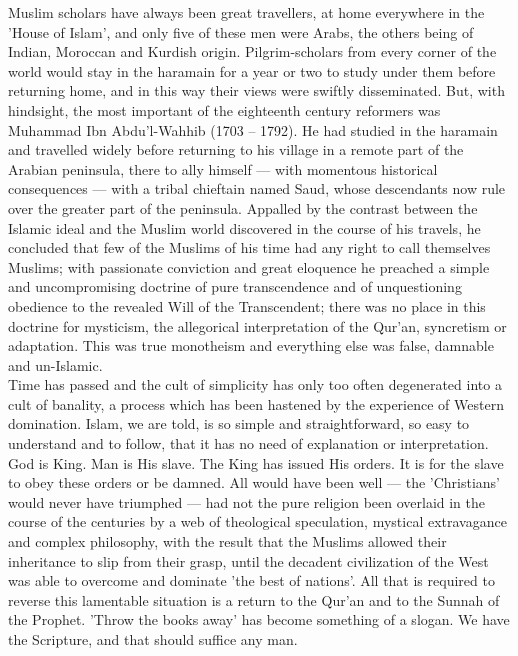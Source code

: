 \documentclass[10pt, twoside,openright]{book}
\begin{document}
Muslim scholars have always been great travellers, at home everywhere in the 'House of Islam', and only five of these men were Arabs, the others being of Indian, Moroccan and Kurdish origin. Pilgrim\hyp{}scholars from every corner of the world would stay in the haramain for a year or two to study under them before returning home, and in this way their views were swiftly disseminated. But, with hindsight, the most important of the eighteenth century reformers was Muhammad Ibn Abdu'l\hyp{}Wahhib (1703 -- 1792). He had studied in the haramain and travelled widely before returning to his village in a remote part of the Arabian peninsula, there to ally himself --- with momentous historical consequences --- with a tribal chieftain named Saud, whose descendants now rule over the greater part of the peninsula. Appalled by the contrast between the Islamic ideal and the Muslim world discovered in the course of his travels, he concluded that few of the Muslims of his time had any right to call themselves Muslims; with passionate conviction and great eloquence he preached a simple and uncompromising doctrine of pure transcendence and of unquestioning obedience to the revealed Will of the Transcendent; there was no place in this doctrine for mysticism, the allegorical interpretation of the Qur'an, syncretism or adaptation. This was true monotheism and everything else was false, damnable and un\hyp{}Islamic. \\

Time has passed and the cult of simplicity has only too often degenerated into a cult of banality, a process which has been hastened by the experience of Western domination. Islam, we are told, is so simple and straightforward, so easy to understand and to follow, that it has no need of explanation or interpretation. God is King. Man is His slave. The King has issued His orders. It is for the slave to obey these orders or be damned. All would have been well --- the 'Christians' would never have triumphed --- had not the pure religion been overlaid in the course of the centuries by a web of theological speculation, mystical extravagance and complex philosophy, with the result that the Muslims allowed their inheritance to slip from their grasp, until the decadent civilization of the West was able to overcome and dominate 'the best of nations'. All that is required to reverse this lamentable situation is a return to the Qur'an and to the Sunnah of the Prophet. 'Throw the books away' has become something of a slogan. We have the Scripture, and that should suffice any man. \\
\end{document}
